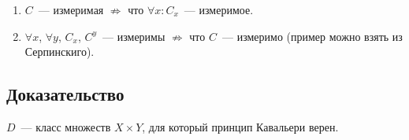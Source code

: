 \documentclass{article}
\begin{document}
            \begin{enumerate}
            
                \item $C$~--- измеримая $\not\Rightarrow$ что $\forall x : C_x$~--- измеримое.
                
                \item $\forall x$, $\forall y$, $C_x$, $C^y$~--- измеримы $\not\Rightarrow$ что $C$~--- измеримо (пример можно взять из Серпинскиго).
                
            \end{enumerate}
            
        \subsection{Доказательство}
        
            $D$~--- класс множеств $X \times Y$, для который принцип Кавальери верен.
            
\end{document}
